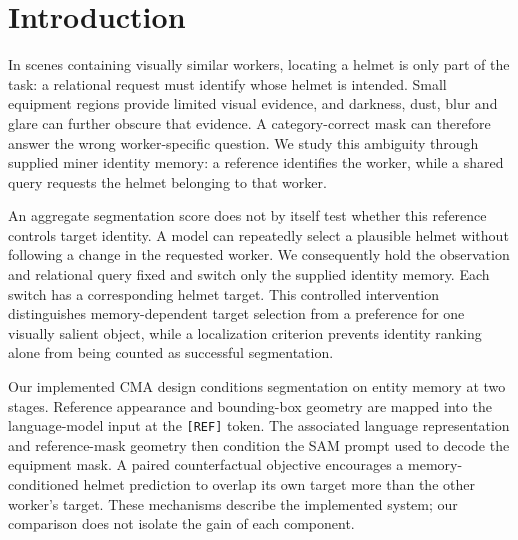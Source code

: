 \section{Introduction}
\label{sec:introduction}
In scenes containing visually similar workers, locating a helmet is only part
of the task: a relational request must identify whose helmet is intended.
Small equipment regions provide limited visual evidence, and darkness, dust,
blur and glare can further obscure that evidence. A category-correct mask can
therefore answer the wrong worker-specific question. We study this ambiguity
through supplied miner identity memory: a reference identifies the worker,
while a shared query requests the helmet belonging to that worker.

An aggregate segmentation score does not by itself test whether this reference
controls target identity. A model can repeatedly select a plausible helmet
without following a change in the requested worker. We consequently hold the
observation and relational query fixed and switch only the supplied identity
memory. Each switch has a corresponding helmet target. This controlled
intervention distinguishes memory-dependent target selection from a preference
for one visually salient object, while a localization criterion prevents
identity ranking alone from being counted as successful segmentation.

Our implemented CMA design conditions segmentation on entity memory at two
stages. Reference appearance and bounding-box geometry are mapped into the
language-model input at the \texttt{[REF]} token. The associated language
representation and reference-mask geometry then condition the SAM prompt used
to decode the equipment mask. A paired counterfactual objective encourages a
memory-conditioned helmet prediction to overlap its own target more than the
other worker's target. These mechanisms describe the implemented system; our
comparison does not isolate the gain of each component.


